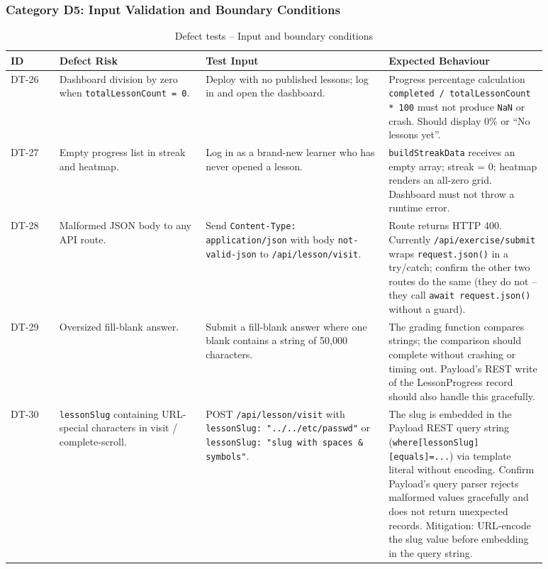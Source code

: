\subsubsection{Category D5: Input Validation and Boundary Conditions}

\begin{longtable}{p{0.08\linewidth} p{0.24\linewidth} p{0.30\linewidth} p{0.26\linewidth}}
\caption{Defect tests -- Input and boundary conditions}\\
\toprule
ID & Defect Risk & Test Input & Expected Behaviour \\
\midrule
\endhead
DT-26 & Dashboard division by zero when \texttt{totalLessonCount = 0}. & Deploy with no published lessons; log in and open the dashboard. & Progress percentage calculation \texttt{completed / totalLessonCount * 100} must not produce \texttt{NaN} or crash. Should display 0\% or ``No lessons yet''. \\
DT-27 & Empty progress list in streak and heatmap. & Log in as a brand-new learner who has never opened a lesson. & \texttt{buildStreakData} receives an empty array; streak = 0; heatmap renders an all-zero grid. Dashboard must not throw a runtime error. \\
DT-28 & Malformed JSON body to any API route. & Send \texttt{Content-Type: application/json} with body \texttt{not-valid-json} to \texttt{/api/lesson/visit}. & Route returns HTTP 400. Currently \texttt{/api/exercise/submit} wraps \texttt{request.json()} in a try/catch; confirm the other two routes do the same (they do not -- they call \texttt{await request.json()} without a guard). \\
DT-29 & Oversized fill-blank answer. & Submit a fill-blank answer where one blank contains a string of 50,000 characters. & The grading function compares strings; the comparison should complete without crashing or timing out. Payload's REST write of the LessonProgress record should also handle this gracefully. \\
DT-30 & \texttt{lessonSlug} containing URL-special characters in visit / complete-scroll. & POST \texttt{/api/lesson/visit} with \texttt{lessonSlug: "../../etc/passwd"} or \texttt{lessonSlug: "slug with spaces \& symbols"}. & The slug is embedded in the Payload REST query string (\texttt{where[lessonSlug][equals]=...}) via template literal without encoding. Confirm Payload's query parser rejects malformed values gracefully and does not return unexpected records. Mitigation: URL-encode the slug value before embedding in the query string. \\
\bottomrule
\end{longtable}

